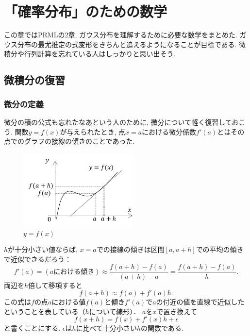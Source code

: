 \setcounter{chapter}{1}
\chapter{「確率分布」のための数学}

この章ではPRMLの2章, ガウス分布を理解するために必要な数学をまとめた.
ガウス分布の最尤推定の式変形をきちんと追えるようになることが目標である.
微積分や行列計算を忘れている人はしっかりと思い出そう.

\section{微積分の復習}
\subsection{微分の定義}
微分の積の公式も忘れたなあという人のために, 微分について軽く復習しておこう.
関数$y=f(x)$が与えられたとき, 点$x=a$における微分係数$f'(a)$とはその点でのグラフの接線の傾きのことであった.
\begin{figure}[ht]
 \centering
 \begin{minipage}{0.5\hsize}
  \centering
   \hspace*{-1.7cm}\includegraphics[bb=0 10 160 110,width=6cm]{./f_x.pdf}
  \caption{$y=f(x)$}
  \label{f_x}
 \end{minipage}
\end{figure}

$h$が十分小さい値ならば, $x=a$での接線の傾きは区間$[a, a+h]$での平均の傾きで近似できるだろう：
$$
  f'(a) = (\text{$a$における傾き})
  \approx \frac{f(a+h)-f(a)}{(a+h)-a}
  = \frac{f(a+h)-f(a)}{h}.
$$
両辺を$h$倍して移項すると
$$
f(a+h) \approx f(a) + f'(a)h.
$$
この式は$f$の点$a$における値$f(a)$と傾き$f'(a)$で$a$の付近の値を直線で近似したということを表している（$h$について線形）．
$a$を$x$で置き換えて
$$
f(x+h) = f(x) + f'(x)h + \epsilon
$$
と書くことにする. $\epsilon$は$h$に比べて十分小さい$h$の関数である.

